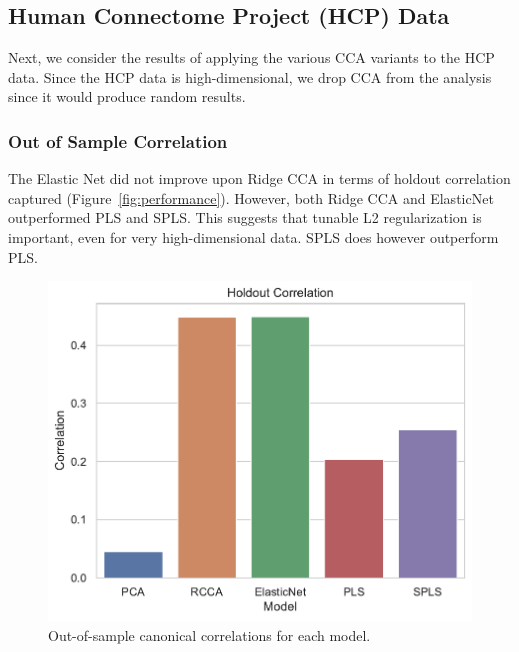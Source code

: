 %
%

\newpage
\subsection{Human Connectome Project (HCP) Data}

Next, we consider the results of applying the various CCA variants to the HCP data.
Since the HCP data is high-dimensional, we drop CCA from the analysis since it would produce random results.

\subsubsection{Out of Sample Correlation}

The Elastic Net did not improve upon Ridge CCA in terms of holdout correlation captured (Figure~\ref{fig:performance}).
However, both Ridge CCA and ElasticNet outperformed PLS and SPLS.
This suggests that tunable L2 regularization is important, even for very high-dimensional data.
SPLS does however outperform PLS.

\begin{figure}
\centering
\includegraphics[width=0.5\linewidth]{figures/regularization/hcp/holdout_correlations}
\caption{Out-of-sample canonical correlations for each model.}
\end{figure}

